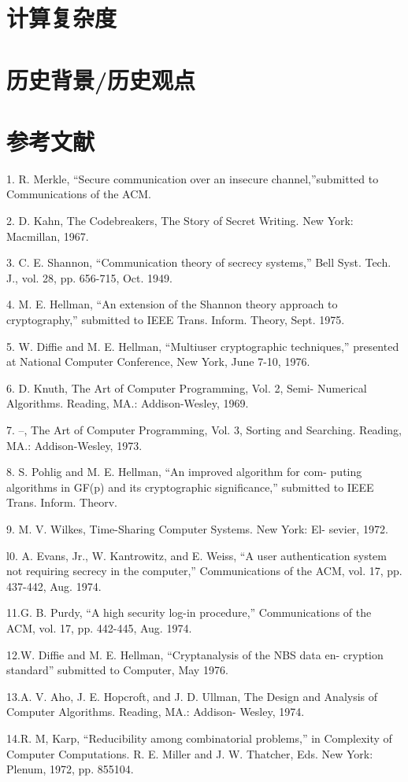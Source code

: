 \documentclass[]{article}
\begin{document}
	\section{计算复杂度}
	
	\section{ 历史背景/历史观点}
	
	\section*{参考文献}
    1. R. Merkle, “Secure communication over an insecure channel,”submitted to Communications of the ACM.\par
	2. D. Kahn, The Codebreakers, The Story of Secret Writing. New
	York: Macmillan, 1967.\par
	3. C. E. Shannon, “Communication theory of secrecy systems,” Bell
	Syst. Tech. J., vol. 28, pp. 656-715, Oct. 1949.\par
	4. M. E. Hellman, “An extension of the Shannon theory approach to
	cryptography,” submitted to IEEE Trans. Inform. Theory, Sept.
	1975.\par
	5. W. Diffie and M. E. Hellman, “Multiuser cryptographic techniques,”
	presented at National Computer Conference, New York, June 7-10,
	1976.\par
	6. D. Knuth, The Art of Computer Programming, Vol. 2, Semi-
	Numerical Algorithms. Reading, MA.: Addison-Wesley, 1969.\par
	7. --, The Art of Computer Programming, Vol. 3, Sorting and
	Searching. Reading, MA.: Addison-Wesley, 1973.\par
	8. S. Pohlig and M. E. Hellman, “An improved algorithm for com-
	puting algorithms in GF(p) and its cryptographic significance,”
	submitted to IEEE Trans. Inform. Theorv.\par
	9. M. V. Wilkes, Time-Sharing Computer Systems. New York: El-
	sevier, 1972.\par
	l0. A. Evans, Jr., W. Kantrowitz, and E. Weiss, “A user authentication
	system not requiring secrecy in the computer,” Communications
	of the ACM, vol. 17, pp. 437-442, Aug. 1974.\par
	11.G. B. Purdy, “A high security log-in procedure,” Communications
	of the ACM, vol. 17, pp. 442-445, Aug. 1974.\par
	12.W. Diffie and M. E. Hellman, “Cryptanalysis of the NBS data en-
	cryption standard” submitted to Computer, May 1976.\par
	13.A. V. Aho, J. E. Hopcroft, and J. D. Ullman, The Design and
	Analysis of Computer Algorithms. Reading, MA.: Addison-
	Wesley, 1974.\par
	14.R. M, Karp, “Reducibility among combinatorial problems,” in
	Complexity of Computer Computations. R. E. Miller and J. W.
	Thatcher, Eds. New York: Plenum, 1972, pp. 855104.\par
\end{document}
